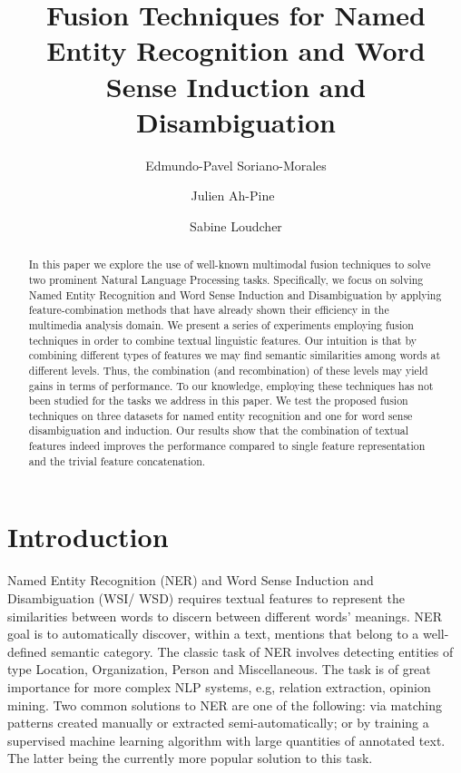 \documentclass{llncs}
\title{Fusion Techniques for Named Entity Recognition and Word Sense Induction and Disambiguation}
\author{Edmundo-Pavel Soriano-Morales \and Julien Ah-Pine\
 \and Sabine Loudcher}
\institute{University of Lyon, Universit\`{e} Lyon 2, Laboratoire ERIC, Lyon, France,\\
\email{\{edmundo.soriano-morales, julien.ah-pine, sabine.loudcher\}@univ-lyon2.fr}}
\date{}
\begin{document}
\maketitle
\begin{abstract}
In this paper we explore the use of well-known multimodal fusion techniques to solve two prominent Natural Language Processing tasks. Specifically, we focus on solving Named Entity Recognition and Word Sense Induction and Disambiguation by applying feature-combination methods that have already shown their efficiency in the multimedia analysis domain. We present a series of experiments employing fusion techniques in order to combine textual linguistic features. Our intuition is that by combining different types of features we may find semantic similarities among words at different levels. Thus, the combination (and recombination) of these levels may yield gains in terms of performance. To our knowledge, employing these techniques has not been studied for the tasks we address in this paper. 
We test the proposed fusion techniques on three datasets for named entity recognition and one for word sense disambiguation and induction. Our results show that the combination of textual features indeed improves the performance compared to single feature representation and the trivial feature concatenation.
\end{abstract}


\section{Introduction}

Named Entity Recognition (NER) and Word Sense Induction and Disambiguation (WSI/ \allowbreak WSD) requires textual features to represent the similarities between words to discern between different words' meanings. NER goal is to automatically discover, within a text, mentions that belong to a well-defined semantic category. The classic task of NER involves detecting entities of type Location, Organization, Person and Miscellaneous. The task is of great importance for more complex NLP systems, e.g, relation extraction, opinion mining. Two common solutions to NER are one of the following: via matching patterns created manually or extracted semi-automatically; or by training a supervised machine learning algorithm with large quantities of annotated text. The latter being the currently more popular solution to this task.




\end{document}
